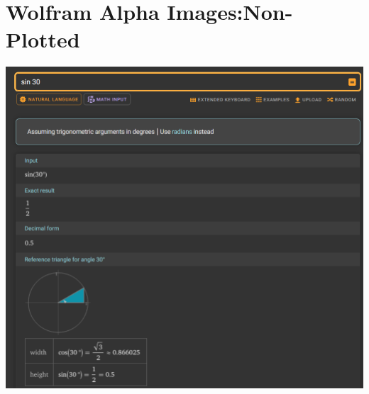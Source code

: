 \documentclass[a4paper, oneside, 11pt]{report}
\begin{document}
\section{Wolfram Alpha Images:Non-Plotted}\label{WolframUnplotted}

\includegraphics[width = 160mm]{Screenshot 2025-01-03 162013.png} \\

\label{app:other}
\end{document}
